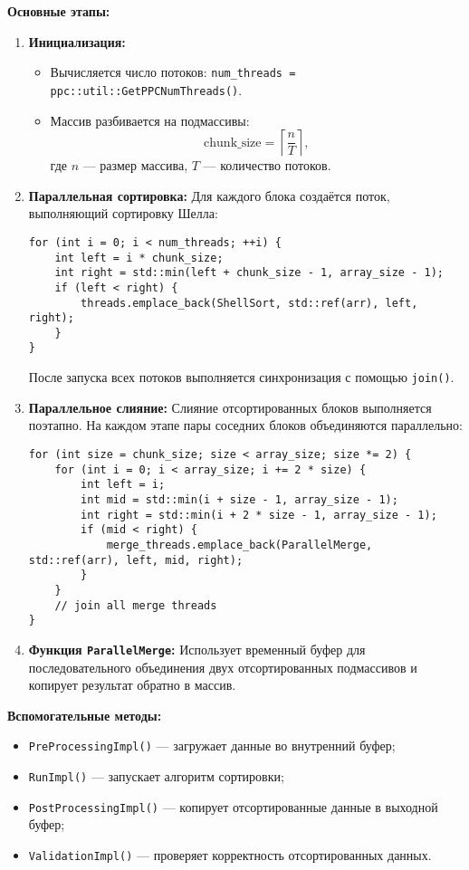 \documentclass[12pt]{article}
\begin{document}
\textbf{Основные этапы:}
\begin{enumerate}
  \item \textbf{Инициализация:}
  \begin{itemize}
    \item Вычисляется число потоков: \texttt{num\_threads = ppc::util::GetPPCNumThreads()}.
    \item Массив разбивается на подмассивы: 
    \[
    \text{chunk\_size} = \left\lceil \frac{n}{T} \right\rceil,
    \]
    где $n$ — размер массива, $T$ — количество потоков.
  \end{itemize}

  \item \textbf{Параллельная сортировка:}
  Для каждого блока создаётся поток, выполняющий сортировку Шелла:
  \begin{lstlisting}
for (int i = 0; i < num_threads; ++i) {
    int left = i * chunk_size;
    int right = std::min(left + chunk_size - 1, array_size - 1);
    if (left < right) {
        threads.emplace_back(ShellSort, std::ref(arr), left, right);
    }
}
  \end{lstlisting}
  После запуска всех потоков выполняется синхронизация с помощью \texttt{join()}.

  \item \textbf{Параллельное слияние:}
  Слияние отсортированных блоков выполняется поэтапно. На каждом этапе пары соседних блоков объединяются параллельно:
  \begin{lstlisting}
for (int size = chunk_size; size < array_size; size *= 2) {
    for (int i = 0; i < array_size; i += 2 * size) {
        int left = i;
        int mid = std::min(i + size - 1, array_size - 1);
        int right = std::min(i + 2 * size - 1, array_size - 1);
        if (mid < right) {
            merge_threads.emplace_back(ParallelMerge, std::ref(arr), left, mid, right);
        }
    }
    // join all merge threads
}
  \end{lstlisting}

  \item \textbf{Функция \texttt{ParallelMerge}:}
  Использует временный буфер для последовательного объединения двух отсортированных подмассивов и копирует результат обратно в массив.
\end{enumerate}

\textbf{Вспомогательные методы:}
\begin{itemize}
  \item \texttt{PreProcessingImpl()} — загружает данные во внутренний буфер;
  \item \texttt{RunImpl()} — запускает алгоритм сортировки;
  \item \texttt{PostProcessingImpl()} — копирует отсортированные данные в выходной буфер;
  \item \texttt{ValidationImpl()} — проверяет корректность отсортированных данных.
\end{itemize}
\end{document}
